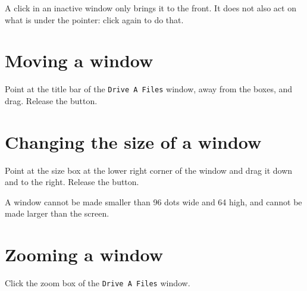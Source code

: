 
A click in an inactive window only brings it to the front.  It does not
also act on what is under the pointer: click again to do that.

\section{Moving a window}
\begin{TaskSteps}
\Step Point at the title bar of the \texttt{Drive A Files} window, away
from the boxes, and drag.
\Step Release the button.
\end{TaskSteps}


\section{Changing the size of a window}
\begin{TaskSteps}
\Step Point at the size box at the lower right corner of the window and
drag it down and to the right.
\Step Release the button.
\end{TaskSteps}


A window cannot be made smaller than 96 dots wide and 64 high, and cannot
be made larger than the screen.

\section{Zooming a window}
\begin{TaskSteps}
\Step Click the zoom box of the \texttt{Drive A Files} window.
\end{TaskSteps}


